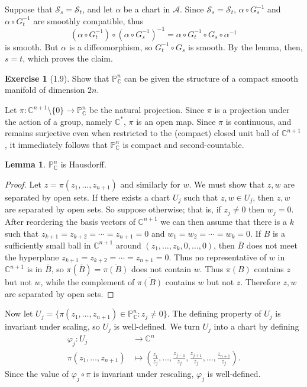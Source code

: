 \documentclass[10pt]{article}
\newcommand{\CC}{\mathbb{C}}
\newcommand{\PP}{\mathbb P}
\theoremstyle{definition}
\newtheorem{exer}{Exercise}
\newtheorem{lemma}{Lemma}[exer]
\begin{document}
Suppose that $\mathcal S_s = \mathcal S_t$, and let $\alpha$ be a chart in $\mathcal A$.
Since $\mathcal S_s = \mathcal S_t$, $\alpha \circ G_s^{-1}$ and $\alpha \circ G_t^{-1}$ are smoothly compatible, thus
$$(\alpha \circ G_t^{-1}) \circ (\alpha \circ G_s^{-1})^{-1} = \alpha \circ G_t^{-1} \circ G_s \circ \alpha^{-1}$$
is smooth. But $\alpha$ is a diffeomorphism, so $G_t^{-1} \circ G_s$ is smooth. By the lemma, then, $s = t$, which proves the claim.

\begin{exer}[1.9]
Show that $\PP_\CC^n$ can be given the structure of a compact smooth manifold of dimension $2n$.
\end{exer}

Let $\pi: \CC^{n+1} \setminus \{0\} \to \PP_\CC^n$ be the natural projection.
Since $\pi$ is a projection under the action of a group, namely $\CC^*$, $\pi$ is an open map.
Since $\pi$ is continuous, and remains surjective even when restricted to the (compact) closed unit ball of $\CC^{n+1}$, it immediately follows that $\PP_\CC^n$ is compact and second-countable.

\begin{lemma}
$\PP_\CC^n$ is Hausdorff.
\end{lemma}
\begin{proof}
Let $z = \pi(z_1, \dots, z_{n+1})$ and similarly for $w$.
We must show that $z,w$ are separated by open sets.
If there exists a chart $U_j$ such that $z, w \in U_j$, then $z,w$ are separated by open sets.
So suppose otherwise; that is, if $z_j \neq 0$ then $w_j = 0$.
After reordering the basis vectors of $\CC^{n+1}$ we can then assume that there is a $k$ such that $z_{k+1} = z_{k+2} = \cdots = z_{n+1} = 0$ and $w_1 = w_2 = \cdots = w_k = 0$.
If $B$ is a sufficiently small ball in $\CC^{n+1}$ around $(z_1, \dots, z_k, 0, \dots, 0)$, then $\overline B$ does not meet the hyperplane $z_{k+1} = z_{k+2} = \cdots = z_{n+1} = 0$.
Thus no representative of $w$ in $\CC^{n+1}$ is in $\overline B$, so $\pi(\overline B) = \overline{\pi(B)}$ does not contain $w$.
Thus $\pi(B)$ contains $z$ but not $w$, while the complement of $\overline{\pi(B)}$ contains $w$ but not $z$.
Therefore $z, w$ are separated by open sets.
\end{proof}

Now let $U_j = \{\pi(z_1, \dots, z_{n+1}) \in \PP_\CC^n: z_j \neq 0\}$.
The defining property of $U_j$ is invariant under scaling, so $U_j$ is well-defined.
We turn $U_j$ into a chart by defining
\begin{align*}
\varphi_j: U_j &\to \CC^n\\
\pi(z_1, \dots, z_{n+1}) &\mapsto \left(\frac{z_1}{z_j}, \dots, \frac{z_{j-1}}{z_j}, \frac{z_{j+1}}{z_j}, \dots, \frac{z_{n+1}}{z_j}\right).
\end{align*}
Since the value of $\varphi_j \circ \pi$ is invariant under rescaling, $\varphi_j$ is well-defined.
\end{document}
